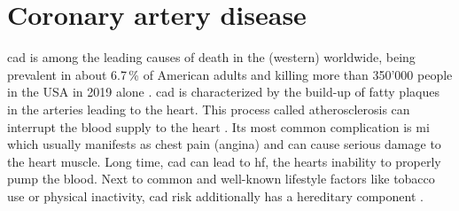 \section{Coronary artery disease}
\label{sec:cad}
\Ac{cad} is among the leading causes of death in the (western) worldwide, being prevalent in about 6.7\,\% of American adults and killing more than 350'000 people in the USA in 2019 alone \cite{centersfordiseasecontrolandpreventionHeartDiseaseFacts2022, fryarPrevalenceUncontrolledRisk2012}. \Ac{cad} is characterized by the build-up of fatty plaques in the arteries leading to the heart. This process called atherosclerosis can interrupt the blood supply to the heart \cite{nationalhealthserviceHeartAttack2017}. Its most common complication is \ac{mi} which usually manifests as chest pain (angina) and can cause serious damage to the heart muscle. Long time, \ac{cad} can lead to \ac{hf}, the hearts inability to properly pump the blood. Next to common and well-known lifestyle factors like tobacco use or physical inactivity, \ac{cad} risk additionally has a hereditary component \cite{montalescot2013ESCGuidelines2013}.


